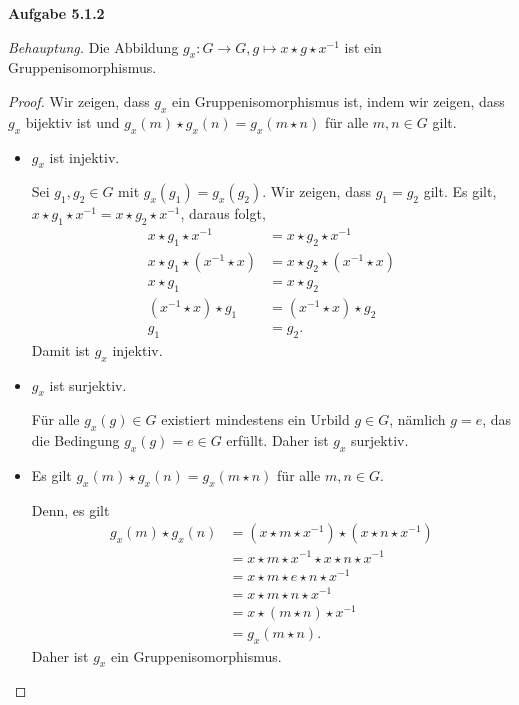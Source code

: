 \documentclass[12pt]{extarticle}
\begin{document}
\textbf{Aufgabe 5.1.2}

\textit{Behauptung.}  Die Abbildung $g_x: G \rightarrow G, g \mapsto x
\star g \star x^{-1}$ ist ein Gruppenisomorphismus.

\begin{proof}
  Wir zeigen, dass \(g_x\) ein Gruppenisomorphismus ist, indem wir
  zeigen, dass \(g_x\) bijektiv ist und
  \(g_x(m) \star g_x(n) = g_x(m \star n)\) für alle \(m, n \in G\) gilt.
  \begin{itemize}
  \item \(g_x\) ist injektiv.

    Sei \(g_1, g_2 \in G\) mit \(g_x(g_1) = g_x(g_2)\). Wir zeigen, dass
    \(g_1 = g_2\) gilt.  Es gilt,  $x \star g_1 \star x^{-1} = x \star g_2
    \star x^{-1}$, daraus folgt,
\begin{align*}
  x \star g_1 \star x^{-1} &= x \star g_2  \star x^{-1}\\
  x \star g_1 \star (x^{-1} \star x)
                           &= x \star g_2  \star (x^{-1} \star x)\\
  x \star g_1 &= x \star g_2\\
  (x^{-1} \star x) \star g_1 &= (x^{-1} \star x) \star g_2\\
  g_1 &= g_2.
\end{align*}
Damit ist \(g_x\) injektiv.
\item \(g_x\) ist surjektiv.

  Für alle \(g_x(g) \in G\) existiert mindestens ein Urbild \(g \in G\),
  nämlich \(g = e\), das die Bedingung \(g_x(g) = e \in G\) erfüllt.
  Daher ist \(g_x\) surjektiv.

  \item Es gilt \(g_x(m) \star g_x(n) = g_x(m \star n)\) für alle $m, n
    \in G$.

    Denn, es gilt
\begin{align*}
  g_x(m) \star g_x(n)
  &= (x \star m \star x^{-1}) \star (x \star n \star x^{-1})\\
  &= x \star m \star x^{-1} \star x \star n \star x^{-1}\\
  &= x \star m \star e \star n \star x^{-1}\\
  &= x \star m \star n \star x^{-1}\\
  &= x \star (m \star n) \star x^{-1}\\
  &= g_x(m \star n).
\end{align*}
Daher ist \(g_x\) ein Gruppenisomorphismus.
  \end{itemize}
\end{proof}
\end{document}
